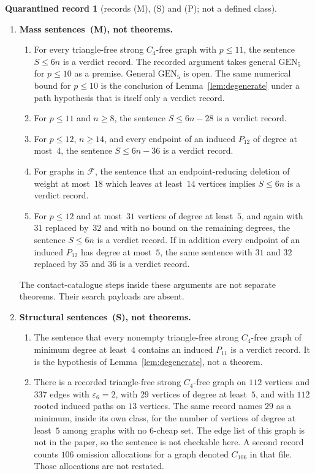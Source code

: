 \documentclass[11pt]{amsart}
\theoremstyle{definition}
\newtheorem*{qbox}{Quarantined record}
\theoremstyle{remark}
\newcommand{\pp}{p}
\newcommand{\GEN}{\mathrm{GEN}}
\begin{document}
\begin{qbox}[records (M), (S) and (P); not a defined class]
\begin{enumerate}
\item \textbf{Mass sentences~\textup{(M)}, not theorems.}
\begin{enumerate}
\item For every triangle-free strong $C_4$-free graph with $\pp\le 11$, the sentence $S\le 6n$ is a verdict record. The recorded argument takes general $\GEN_5$ for $\pp\le 10$ as a premise. General $\GEN_5$ is open. The same numerical bound for $\pp\le 10$ is the conclusion of Lemma~\ref{lem:degenerate} under a path hypothesis that is itself only a verdict record.
\item For $\pp\le 11$ and $n\ge 8$, the sentence $S\le 6n-28$ is a verdict record.
\item For $\pp\le 12$, $n\ge 14$, and every endpoint of an induced $P_{12}$ of degree at most~$4$, the sentence $S\le 6n-36$ is a verdict record.
\item For graphs in $\mathcal F$, the sentence that an endpoint-reducing deletion of weight at most~$18$ which leaves at least~$14$ vertices implies $S\le 6n$ is a verdict record.
\item For $\pp\le 12$ and at most~$31$ vertices of degree at least~$5$, and again with $31$ replaced by~$32$ and with no bound on the remaining degrees, the sentence $S\le 6n$ is a verdict record. If in addition every endpoint of an induced $P_{12}$ has degree at most~$5$, the same sentence with $31$ and $32$ replaced by $35$ and $36$ is a verdict record.
\end{enumerate}
The contact-catalogue steps inside these arguments are not separate theorems. Their search payloads are absent.
\item \textbf{Structural sentences~\textup{(S)}, not theorems.}
\begin{enumerate}
\item The sentence that every nonempty triangle-free strong $C_4$-free graph of minimum degree at least~$4$ contains an induced $P_{11}$ is a verdict record. It is the hypothesis of Lemma~\ref{lem:degenerate}, not a theorem.
\item There is a recorded triangle-free strong $C_4$-free graph on $112$ vertices and $337$ edges with $\varepsilon_6=2$, with $29$ vertices of degree at least~$5$, and with $112$ rooted induced paths on $13$ vertices. The same record names $29$ as a minimum, inside its own class, for the number of vertices of degree at least~$5$ among graphs with no $6$-cheap set. The edge list of this graph is not in the paper, so the sentence is not checkable here. A second record counts $106$ omission allocations for a graph denoted $C_{106}$ in that file. Those allocations are not restated.

\end{enumerate}
\end{enumerate}
\end{qbox}
\end{document}
